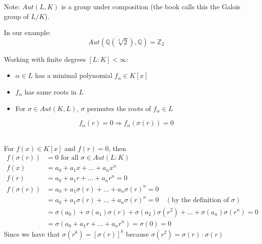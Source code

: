 \documentclass{article}
\begin{document}
Note: $Aut(L,K)$ is a group under composition (the book calls this the Galois group of $L/K$).

In our example: $$Aut(\mathbb{Q}(\sqrt[4]{2}), \mathbb{Q}) = \mathbb{Z}_2$$

\hrulefill

Working with finite degrees $[L:K] < \infty$:
\begin{itemize}
    \item $\alpha \in L$ has a minimal polynomial $f_\alpha \in K[x]$
    \item $f_\alpha$ has same roots in $L$
    \item For $\sigma \in Aut(K,L)$, $\sigma$ permutes the roots of $f_\alpha \in L$
\end{itemize}
$$f_\alpha(r) = 0 \Rightarrow f_\alpha(\sigma(r)) = 0$$

\hrulefill \\ 
For $f(x) \in K[x]$ and $f(r) = 0$, then
\begin{align*}
    f(\sigma(r)) &= 0 \text{ for all } \sigma \in Aut(L:K) \\
    f(x) &= a_0 + a_1 x + \dots + a_n x^n \\
    f(r) &= a_0 + a_1 r + \dots + a_n r^n = 0 \\
    f(\sigma(r)) &= a_0 + a_1 \sigma(r) + \dots + a_n \sigma(r)^n = 0 \\
    &= a_0 + a_1 \sigma(r) + \dots + a_n \sigma(r)^n = 0 \quad (\text{by the definition of } \sigma)\\
    &= \sigma(a_0) + \sigma(a_1) \sigma(r) + \sigma(a_2) \sigma(r^2)+ \dots + \sigma(a_n) \sigma(r^n) = 0 \\
    &= \sigma(a_0 + a_1 r + \dots + a_n r^n) = \sigma(0) = 0
\end{align*}
Since we have that $\sigma(r^k) = [\sigma(r)]^k$ because $\sigma(r^2) = \sigma(r) \cdot \sigma(r)$ 
\end{document}
